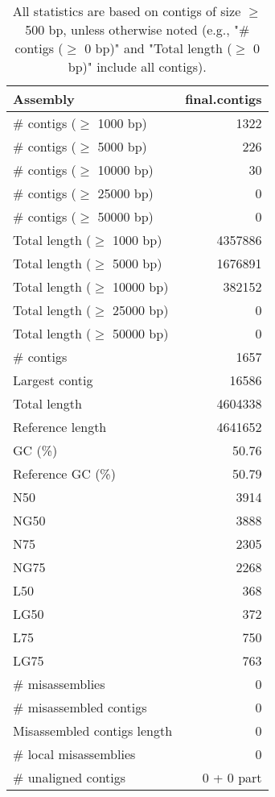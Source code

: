 \documentclass[12pt,a4paper]{article}
\begin{document}
\begin{table}[ht]
\begin{center}
\caption{All statistics are based on contigs of size $\geq$ 500 bp, unless otherwise noted (e.g., "\# contigs ($\geq$ 0 bp)" and "Total length ($\geq$ 0 bp)" include all contigs).}
\begin{tabular}{|l*{1}{|r}|}
\hline
Assembly & final.contigs \\ \hline
\# contigs ($\geq$ 1000 bp) & 1322 \\ \hline
\# contigs ($\geq$ 5000 bp) & 226 \\ \hline
\# contigs ($\geq$ 10000 bp) & 30 \\ \hline
\# contigs ($\geq$ 25000 bp) & 0 \\ \hline
\# contigs ($\geq$ 50000 bp) & 0 \\ \hline
Total length ($\geq$ 1000 bp) & 4357886 \\ \hline
Total length ($\geq$ 5000 bp) & 1676891 \\ \hline
Total length ($\geq$ 10000 bp) & 382152 \\ \hline
Total length ($\geq$ 25000 bp) & 0 \\ \hline
Total length ($\geq$ 50000 bp) & 0 \\ \hline
\# contigs & 1657 \\ \hline
Largest contig & 16586 \\ \hline
Total length & 4604338 \\ \hline
Reference length & 4641652 \\ \hline
GC (\%) & 50.76 \\ \hline
Reference GC (\%) & 50.79 \\ \hline
N50 & 3914 \\ \hline
NG50 & 3888 \\ \hline
N75 & 2305 \\ \hline
NG75 & 2268 \\ \hline
L50 & 368 \\ \hline
LG50 & 372 \\ \hline
L75 & 750 \\ \hline
LG75 & 763 \\ \hline
\# misassemblies & 0 \\ \hline
\# misassembled contigs & 0 \\ \hline
Misassembled contigs length & 0 \\ \hline
\# local misassemblies & 0 \\ \hline
\# unaligned contigs & 0 + 0 part \\ \hline

\end{tabular}
\end{center}
\end{table}
\end{document}

